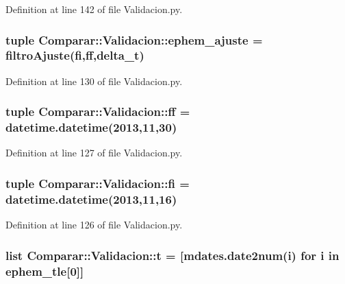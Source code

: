 \-Definition at line 142 of file \-Validacion.\-py.

\subsubsection[{ephem\-\_\-ajuste}]{\setlength{\rightskip}{0pt plus 5cm}tuple {\bf \-Comparar\-::\-Validacion\-::ephem\-\_\-ajuste} = {\bf filtro\-Ajuste}({\bf fi},{\bf ff},{\bf delta\-\_\-t})}\label{namespace_comparar_1_1_validacion_a50893fef7f1b2747da59bc907cca01d2}


\-Definition at line 130 of file \-Validacion.\-py.

\subsubsection[{ff}]{\setlength{\rightskip}{0pt plus 5cm}tuple {\bf \-Comparar\-::\-Validacion\-::ff} = datetime.\-datetime(2013,11,30)}\label{namespace_comparar_1_1_validacion_a3f540791acab573ed18988151a6f9743}


\-Definition at line 127 of file \-Validacion.\-py.

\subsubsection[{fi}]{\setlength{\rightskip}{0pt plus 5cm}tuple {\bf \-Comparar\-::\-Validacion\-::fi} = datetime.\-datetime(2013,11,16)}\label{namespace_comparar_1_1_validacion_a8cfe3ebc5a1963c7aaca951b94e82ccc}


\-Definition at line 126 of file \-Validacion.\-py.

\subsubsection[{t}]{\setlength{\rightskip}{0pt plus 5cm}list {\bf \-Comparar\-::\-Validacion\-::t} = [mdates.\-date2num(i) for i in ephem\-\_\-tle[0]]}\label{namespace_comparar_1_1_validacion_aaef73be31b8b7b2bdb9a00dd43b9ae47}


